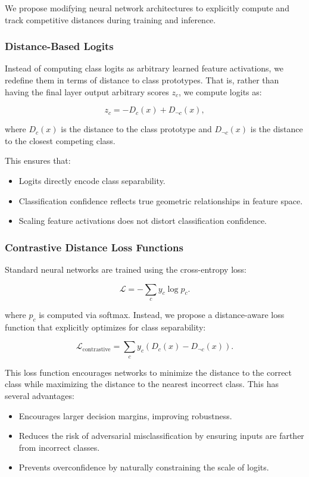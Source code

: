We propose modifying neural network architectures to explicitly compute and track competitive distances during training and inference.

\subsubsection{Distance-Based Logits}

Instead of computing class logits as arbitrary learned feature activations, we redefine them in terms of distance to class prototypes. That is, rather than having the final layer output arbitrary scores \( z_c \), we compute logits as:

\[
z_c = -D_c(x) + D_{\neg c}(x),
\]

where \( D_c(x) \) is the distance to the class prototype and \( D_{\neg c}(x) \) is the distance to the closest competing class.

This ensures that:

\begin{itemize}
    \item Logits directly encode class separability.
    \item Classification confidence reflects true geometric relationships in feature space.
    \item Scaling feature activations does not distort classification confidence.
\end{itemize}

\subsubsection{Contrastive Distance Loss Functions}

Standard neural networks are trained using the cross-entropy loss:

\[
\mathcal{L} = -\sum_c y_c \log p_c.
\]

where \( p_c \) is computed via softmax. Instead, we propose a distance-aware loss function that explicitly optimizes for class separability:

\[
\mathcal{L}_{\text{contrastive}} = \sum_c y_c (D_c(x) - D_{\neg c}(x)).
\]

This loss function encourages networks to minimize the distance to the correct class while maximizing the distance to the nearest incorrect class. This has several advantages:

\begin{itemize}
    \item Encourages larger decision margins, improving robustness.
    \item Reduces the risk of adversarial misclassification by ensuring inputs are farther from incorrect classes.
    \item Prevents overconfidence by naturally constraining the scale of logits.
\end{itemize}

